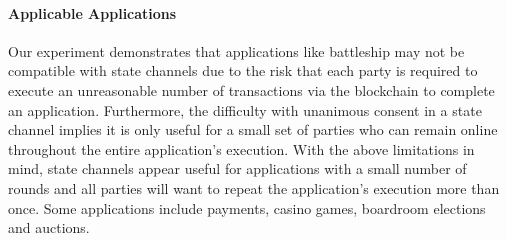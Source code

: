 \documentclass{llncs}
\begin{document}
	\paragraph{Applicable Applications} 
	Our experiment demonstrates that applications like battleship may not be compatible with state channels due to the risk that each party is required to execute an unreasonable number of transactions via the blockchain to complete an application. 
	Furthermore, the difficulty with unanimous consent in a state channel implies it is only useful for a small set of parties who can remain online throughout the entire application's execution. 
	With the above limitations in mind, state channels appear useful for applications with a small number of rounds and all parties will want to repeat the application's execution more than once. 
	Some applications include payments, casino games, boardroom elections and auctions.
	
	
	
\end{document}

